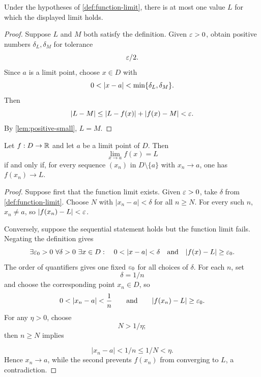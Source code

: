 \begin{theorem}
\label{thm:unique-function-limit}
Under the hypotheses of \cref{def:function-limit}, there is at most one value $L$ for which the displayed limit holds.
\end{theorem}
\begin{proof}
Suppose $L$ and $M$ both satisfy the definition. Given $\varepsilon>0$, obtain positive numbers $\delta_L,\delta_M$ for tolerance
\[
\varepsilon/2.
\]
 Since $a$ is a limit point, choose $x\in D$ with
\[
0<\lvert x-a\rvert<\min\{\delta_L,\delta_M\}.
\]
Then
\[
\lvert L-M\rvert\leq\lvert L-f(x)\rvert+\lvert f(x)-M\rvert<\varepsilon.
\]
By \cref{lem:positive-small}, $L=M$.
\end{proof}

\begin{theorem}
\label{thm:sequential-function-limit}
Let $f:D\to\mathbb{R}$ and let $a$ be a limit point of $D$. Then
\[
\lim_{x\to a}f(x)=L
\]
if and only if, for every sequence $(x_n)$ in $D\setminus\{a\}$ with $x_n\to a$, one has $f(x_n)\to L$.
\end{theorem}
\begin{proof}
Suppose first that the function limit exists. Given $\varepsilon>0$, take $\delta$ from \cref{def:function-limit}. Choose $N$ with $|x_n-a|<\delta$ for all $n\geq N$.
For every such $n$, $x_n\ne a$, so $|f(x_n)-L|<\varepsilon$.

Conversely, suppose the sequential statement holds but the function limit
fails. Negating the definition gives
\[
\exists\eps_0>0\ \forall\delta>0\ \exists x\in D:
\quad 0<|x-a|<\delta\quad\text{and}\quad |f(x)-L|\geq\eps_0.
\]
The order of quantifiers gives one fixed $\varepsilon_0$ for all choices of
$\delta$. For each $n$, set
\[
\delta=1/n
\]
 and choose the corresponding
point $x_n\in D$, so
\[
0<\lvert x_n-a\rvert<\frac1n
\qquad\text{and}\qquad
\lvert f(x_n)-L\rvert\geq\varepsilon_0.
\]
For any $\eta>0$, choose
\[
N>1/\eta;
\]
 then $n\geq N$ implies

\[
|x_n-a|<1/n\leq1/N<\eta.
\]
 Hence $x_n\to a$, while the second prevents $f(x_n)$ from converging to $L$, a contradiction.
\end{proof}

